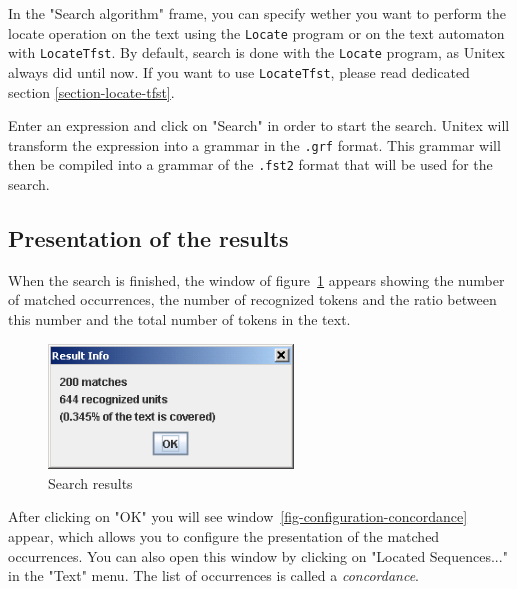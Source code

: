 \bigskip
\noindent In the "Search algorithm" frame, you can specify wether you want to
perform the locate operation on the text using the \verb+Locate+ program or on
the text automaton with \verb+LocateTfst+. By default, search is done with the
\verb+Locate+ program, as Unitex always did until now. If you want to use
\verb+LocateTfst+, please read dedicated section \ref{section-locate-tfst}.

\bigskip
\noindent Enter an expression and click on "Search" in order to start the
search. Unitex will transform the expression into a grammar in the \verb+.grf+ format.
 This grammar will then be compiled into a grammar of
the \verb+.fst2+ format that will be used for the
search.

\subsection{Presentation of the results}
\label{section-display-occurrences}
When the search is finished, the window of
figure~\ref{fig-search-results} appears showing the number of matched
occurrences, the number of recognized tokens and the ratio between this 
number and the total number of tokens in the text.

\bigskip
\begin{figure}[h]
\begin{center}
\includegraphics[width=6.5cm]{resources/img/fig4-5.png}
\caption{Search results \label{fig-search-results}}
\end{center}
\end{figure}

\noindent After clicking on "OK" you will see
window~\ref{fig-configuration-concordance} appear, which allows you to configure
the presentation of the matched occurrences. You can also open this window by
clicking on "Located Sequences..." in the "Text" menu. The list of
occurrences is called a \textit{concordance}.



